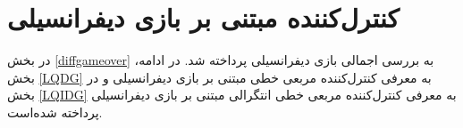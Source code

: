 \section{کنترل‌کننده مبتنی بر بازی دیفرانسیلی}\label{diffgamecontroller}
در بخش
\ref{diffgameover}
به بررسی اجمالی بازی دیفرانسیلی پرداخته شد. در ادامه، بخش
\ref{LQDG}
به معرفی
کنترل‌کننده مربعی خطی مبتنی بر بازی دیفرانسیلی
و در بخش
\ref{LQIDG}
به معرفی
کنترل‌کننده مربعی خطی انتگرالی مبتنی بر بازی دیفرانسیلی
پرداخته شده‌است.


